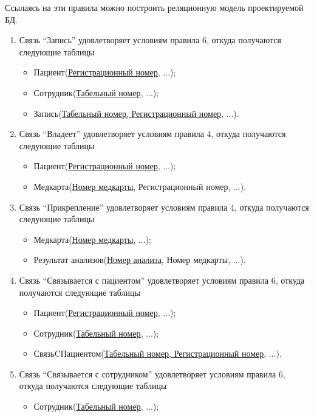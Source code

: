 \documentclass[14pt,a4paper,russian]{extreport}
\begin{document}
Ссылаясь на эти правила можно построить реляционную модель проектируемой БД.
\begin{enumerate}
    \item Связь ``Запись'' удовлетворяет условиям правила 6, откуда получаются следующие
        таблицы
        \begin{itemize}
            \item Пациент(\underline{Регистрационный номер}, ...);
            \item Сотрудник(\underline{Табельный номер}, ...);
            \item Запись(\underline{Табельный номер, Регистрационный номер}, ...).
        \end{itemize}
    \item Связь ``Владеет'' удовлетворяет условиям правила 4, откуда получаются следующие таблицы
        \begin{itemize}
            \item Пациент(\underline{Регистрационный номер}, ...);
            \item Медкарта(\underline{Номер медкарты}, Регистрационный номер, ...).
        \end{itemize}
    \item Связь ``Прикрепление'' удовлетворяет условиям правила 4, откуда получаются следующие
        таблицы
        \begin{itemize}
            \item Медкарта(\underline{Номер медкарты}, ...);
            \item Результат анализов(\underline{Номер анализа}, Номер медкарты, ...).
        \end{itemize}
    \item Связь ``Связывается с пациентом'' удовлетворяет условиям правила 6, откуда получаются
        следующие таблицы
        \begin{itemize}
            \item Пациент(\underline{Регистрационный номер}, ...);
            \item Сотрудник(\underline{Табельный номер}, ...);
            \item СвязьCПациентом(\underline{Табельный номер, Регистрационный номер}, ...).
        \end{itemize}
    \item Связь ``Связывается с сотрудником'' удовлетворяет условиям правила 6, откуда получаются
        следующие таблицы
        \begin{itemize}
            \item Сотрудник(\underline{Табельный номер}, ...);

\end{itemize}
\end{enumerate}
\end{document}
